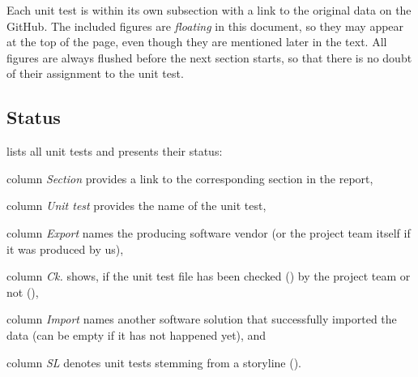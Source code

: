 \documentclass{scrartcl}
\newcommand{\jaja}{\ding{51}}
\newcommand{\nope}{\ding{55}}
\begin{document}
Each unit test is within its own subsection with a link to the original data on the GitHub.
The included figures are \emph{floating} in this document, so they may appear at the top of the page,
 even though they are mentioned later in the text.
All figures are always flushed before the next section starts, so that there is no doubt of their assignment to the unit test.

\subsection{Status}
\label{sec:status}

 lists all unit tests and presents their status:
\begin{compactitem}
  \item column \emph{Section} provides a link to the corresponding section in the report,
  \item column \emph{Unit test} provides the name of the unit test,
  \item column \emph{Export} names the producing software vendor (or the project team itself if it was produced by us),
  \item column \emph{Ck.} shows, if the unit test file has been checked (\jaja) by the project team or not (\nope),
  \item column \emph{Import} names another software solution that successfully imported the data (can be empty if it has not happened yet), and
  \item column \emph{SL} denotes unit tests stemming from a storyline (\jaja).
\end{compactitem}
\end{document}
